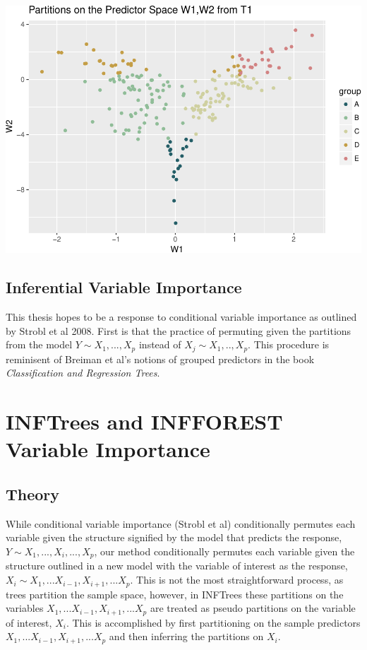 \documentclass[12pt,twoside]{reedthesis}
\begin{document}
  \includegraphics{Thesis_files/figure-latex/unnamed-chunk-6-1.pdf}
  
  \section{Inferential Variable
  Importance}\label{inferential-variable-importance}
  
  This thesis hopes to be a response to conditional variable importance as
  outlined by Strobl et al 2008. First is that the practice of permuting
  given the partitions from the model \(Y \sim X_1,...,X_p\) instead of
  \(X_j \sim X_1,..,X_p\). This procedure is reminisent of Breiman et al's
  notions of grouped predictors in the book \emph{Classification and
  Regression Trees}.
  
  \chapter{INFTrees and INFFOREST Variable
  Importance}\label{inftrees-and-infforest-variable-importance}
  
  \section{Theory}\label{theory}
  
  While conditional variable importance (Strobl et al) conditionally
  permutes each variable given the structure signified by the model that
  predicts the response, \(Y \sim X_1,...,X_i,...,X_p\), our method
  conditionally permutes each variable given the structure outlined in a
  new model with the variable of interest as the response,
  \(X_i \sim X_1,...X_{i-1},X_{i+1},...X_p\). This is not the most
  straightforward process, as trees partition the sample space, however,
  in INFTrees these partitions on the variables
  \(X_1,...X_{i-1},X_{i+1},...X_p\) are treated as pseudo partitions on
  the variable of interest, \(X_i\). This is accomplished by first
  partitioning on the sample predictors \(X_1,...X_{i-1},X_{i+1},...X_p\)
  and then inferring the partitions on \(X_i\).
  
\end{document}
